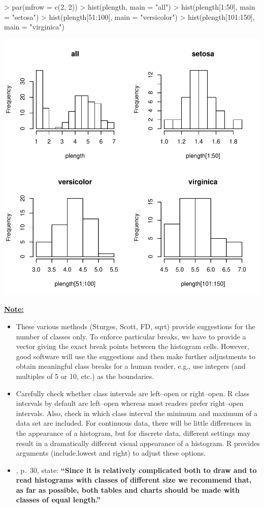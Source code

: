 \documentclass[12pt,letterpaper,final]{article}
\begin{document}
\begin{Schunk}
\begin{Sinput}
> par(mfrow = c(2, 2))
> hist(plength, main = "all")
> hist(plength[1:50], main = "setosa")
> hist(plength[51:100], main = "versicolor")
> hist(plength[101:150], main = "virginica")
\end{Sinput}
\end{Schunk}
\includegraphics{lect_main-006}

\underline{\bf Note:} 
\begin{itemize}
\item These various methods (Sturges, Scott, FD, sqrt) provide suggestions
for the number of classes only. To enforce particular
breaks, we have to provide a vector giving the exact break points 
between the histogram cells. However, good software will use the suggestions
and then make further adjustments to obtain meaningful class breaks for a human
reader, e.g., use integers (and multiples of 5 or 10, etc.) as the boundaries.

\item Carefully check whether class intervals are left--open or right--open.
R class intervals by default are left--open whereas most readers prefer right--open
intervals. Also, check in which class interval the minimum and maximum of a data set are
included. For continuous data, there will be little differences in the 
appearance of a histogram, but for discrete data, different settings
may result in a dramatically different visual appearance of a histogram.
R provides arguments  (include.lowest and right) to adjust these options.

\item \cite{WWPJH96}, p.~30, state:
{\bf ``Since it is relatively complicated both to draw and to read
histograms with classes of different size we recommend that, as far
as possible, both tables and charts should be made with classes
of equal length.''}
\end{itemize}
\end{document}
